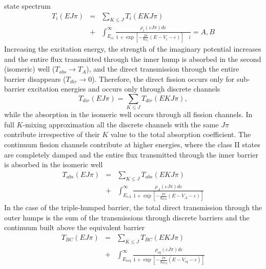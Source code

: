 \documentclass[twocolumn,amsmath,amssymb,10pt,groupedaddress,a4paper]{revtex4}
\begin{document}
state spectrum
\begin{eqnarray}
T_{i}(EJ\pi)&=&\sum_{K\leq J}T_{i}(EKJ\pi)\\
&+&\int_{E_{ci}}^{\infty}\frac{\rho_{i}(\varepsilon J\pi)d\varepsilon}{{1+\exp\left[-\frac{2\pi}{\hbar\omega_{i}}(E-V_{i}-\varepsilon)\right]}\quad i}=A,B\nonumber
\label{tjt}
\end{eqnarray}
 Increasing the excitation energy, the strength of the imaginary potential
increases and the entire flux transmitted through the inner hump is
absorbed in the second (isomeric) well ($T_{abs}\rightarrow T_{A}$),
and the direct transmission through the entire barrier disappears
($T_{dir}\rightarrow0$). Therefore, the direct fission occurs only
for sub-barrier excitation energies and occurs only through discrete
channels
\begin{equation}
T_{dir}(EJ\pi)=\sum_{K\leq J}T_{dir}(EKJ\pi),
\label{tdirt}
\end{equation}
 while the absorption in the isomeric well occurs through all fission
channels. In full $K$-mixing approximation all the discrete channels
with the same $J\pi$ contribute irrespective of their $K$ value
to the total absorption coefficient. The continuum fission channels
contribute at higher energies, where the class II states are completely
damped and the entire flux transmitted through the inner barrier is
absorbed in the isomeric well
\begin{eqnarray}
T_{abs}(EJ\pi)&=&\sum_{K\leq J}T_{abs}(EKJ\pi)\\
&+&\int_{E_{cA}}^{\infty}\frac{\rho_{A}(\varepsilon J\pi)d\varepsilon}{{1+\exp\left[-\frac{2\pi}{\hbar\omega_{A}}(E-V_{A}-\varepsilon)\right]}}\nonumber
\label{tabst}
\end{eqnarray}
 In the case of the triple-humped barrier, the total direct transmission
through the outer humps is the sum of the transmissions through discrete
barriers and the continuum built above the equivalent barrier
\begin{eqnarray}
T_{BC}(EJ\pi)&=&\sum_{K\leq J}T_{BC}(EKJ\pi)\\
&+&\int_{E_{ceq}}^{\infty}\frac{\rho_{eq}(\varepsilon J\pi)d\varepsilon}{{1+\exp\left[-\frac{2\pi}{\hbar\omega_{eq}}(E-V_{eq}-\varepsilon)\right]}}\nonumber
\label{tdir23t}
\end{eqnarray}
\end{document}

